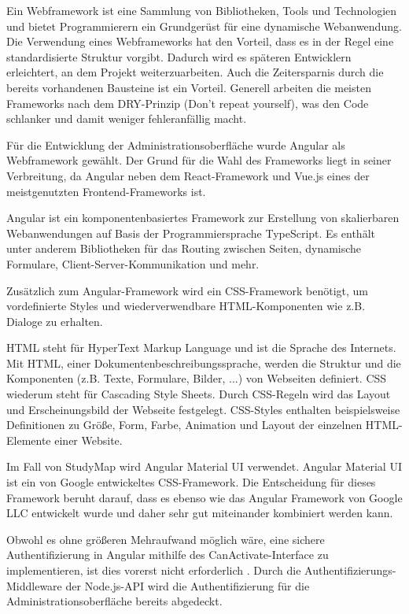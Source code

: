 Ein Webframework ist eine Sammlung von Bibliotheken, Tools und Technologien und bietet Programmierern ein Grundgerüst für eine dynamische Webanwendung. Die Verwendung eines Webframeworks hat den Vorteil, dass es in der Regel eine standardisierte Struktur vorgibt. Dadurch wird es späteren Entwicklern erleichtert, an dem Projekt weiterzuarbeiten. Auch die Zeitersparnis durch die bereits vorhandenen Bausteine ist ein Vorteil. Generell arbeiten die meisten Frameworks nach dem DRY-Prinzip (Don't repeat yourself), was den Code schlanker und damit weniger fehleranfällig macht.
\parencite{domainfactory_beliebtesten_2023}

Für die Entwicklung der Administrationsoberfläche wurde Angular als Webframework gewählt. Der Grund für die Wahl des Frameworks liegt in seiner Verbreitung, da Angular neben dem React-Framework und Vue.js eines der meistgenutzten Frontend-Frameworks ist. \parencite{greif_state_2022}

Angular ist ein komponentenbasiertes Framework zur Erstellung von skalierbaren Webanwendungen auf Basis der Programmiersprache TypeScript. Es enthält unter anderem Bibliotheken für das Routing zwischen Seiten, dynamische Formulare, Client-Server-Kommunikation und mehr. \parencite{google_inc_angular_2023} 

Zusätzlich zum Angular-Framework wird ein CSS-Framework benötigt, um vordefinierte Styles und wiederverwendbare HTML-Komponenten wie z.B. Dialoge zu erhalten.

HTML steht für HyperText Markup Language und ist die Sprache des Internets. Mit HTML, einer Dokumentenbeschreibungssprache, werden die Struktur und die Komponenten (z.B. Texte, Formulare, Bilder, ...) von Webseiten definiert. \parencite{mozilla_corporation_html_2023} CSS wiederum steht für Cascading Style Sheets. Durch CSS-Regeln wird das Layout und Erscheinungsbild der Webseite festgelegt. CSS-Styles enthalten beispielsweise Definitionen zu Größe, Form, Farbe, Animation und Layout der einzelnen HTML-Elemente einer Website. \parencite{mozilla_corporation_what_2024}

Im Fall von StudyMap wird Angular Material UI verwendet. Angular Material UI ist ein von Google entwickeltes CSS-Framework. Die Entscheidung für dieses Framework beruht darauf, dass es ebenso wie das Angular Framework von Google LLC entwickelt wurde und daher sehr gut miteinander kombiniert werden kann. \parencite{google_llc_angular_2024}

Obwohl es ohne größeren Mehraufwand möglich wäre, eine sichere Authentifizierung in Angular mithilfe des CanActivate-Interface zu implementieren, ist dies vorerst nicht erforderlich \parencite{google_inc_angular_2024}. Durch die Authentifizierungs-Middleware der Node.js-API wird die Authentifizierung für die Administrationsoberfläche bereits abgedeckt.

